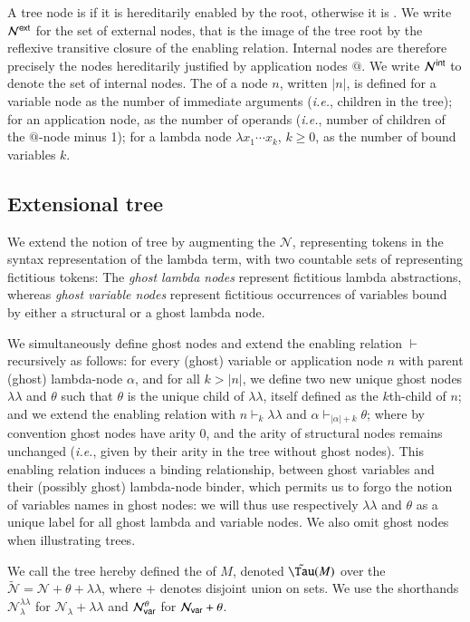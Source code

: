 \documentclass{elsarticle}
\makeatletter
\theoremstyle{plain}
\theoremstyle{definition}
\newcommand\Nodes{\mathcal{N}}%
\newcommand\NodesVar{\Nodes_{\sf var}}%
\newcommand\NodesLmd{\Nodes_\lambda}%
\newcommand{\ghostlmd}{{\lambda\!\!\lambda}}
\newcommand{\ghostvar}{\theta}
\newcommand\ExtendedNodes{\tilde{\Nodes}}
\newcommand\ExtendedNodesVar{\NodesVar^\ghostvar}
\newcommand\ExtendedNodesLmd{\NodesLmd^\ghostlmd}
\newcommand{\enables}{\vdash} %
\newcommand{\exttree}{\tilde{\Tau}} %
\newcommand{\ExternalNodes}{\Nodes^{\sf ext}}
\newcommand{\InternalNodes}{\Nodes^{\sf int}}
\renewcommand\ie{{\it i.e.\@\xspace}}
\makeatother
\begin{document}
A tree node is  if it is hereditarily enabled by the root, otherwise it is . We write $\ExternalNodes$ for the set of external nodes, that is the image of the tree root by the reflexive transitive closure of the enabling relation. Internal nodes are therefore precisely the nodes hereditarily justified by application nodes $@$. We write $\InternalNodes$ to denote the set of internal nodes.
The  of a node $n$, written $|n|$,
is defined for a variable node as the number of immediate arguments (\ie, children in the tree); for an application node, as the number of operands (\ie, number of children of the $@$-node minus 1); for a lambda node $\lambda x_1 \cdots x_k$, $k\geq 0$, as the number of bound variables $k$.

\subsection{Extensional tree}
We extend the notion of tree by augmenting the
  $\Nodes$, representing tokens in the syntax representation of the lambda term,
with two countable sets of  representing fictitious tokens: The \emph{ghost lambda nodes}
represent fictitious lambda abstractions,
whereas \emph{ghost variable nodes} represent fictitious
occurrences of variables bound by either a structural or a ghost lambda node.

We simultaneously define ghost nodes and extend the enabling relation $\enables$ recursively as follows: for every (ghost) variable or application node $n$ with parent (ghost) lambda-node $\alpha$, and for all $k>|n|$, we define two new unique ghost nodes $\ghostlmd$ and $\ghostvar$
such that
$\ghostvar$ is the unique child of $\ghostlmd$, itself defined as the $k$th-child of $n$;
and we extend the enabling relation with $n \enables_k \ghostlmd$
and $\alpha \enables_{|\alpha|+ k} \ghostvar$; where by convention ghost nodes have arity $0$, and the arity of structural nodes remains unchanged (\ie, given by their arity in the tree without ghost nodes).
This enabling relation induces a binding relationship, between ghost variables and their (possibly ghost) lambda-node binder, which permits us to forgo the notion of variables names in ghost nodes: we will thus
use respectively $\ghostlmd$ and $\ghostvar$ as a unique label for all ghost lambda and variable nodes. We also omit ghost nodes when illustrating trees.

We call the tree hereby defined the  of $M$,
denoted $\exttree(M)$ over the  $\ExtendedNodes = \Nodes + \ghostvar + \ghostlmd$, where $+$ denotes disjoint union on sets. We use the shorthands $\ExtendedNodesLmd$ for $\NodesLmd + \ghostlmd$ and $\ExtendedNodesVar$ for $\NodesVar + \ghostvar$.
\end{document}
